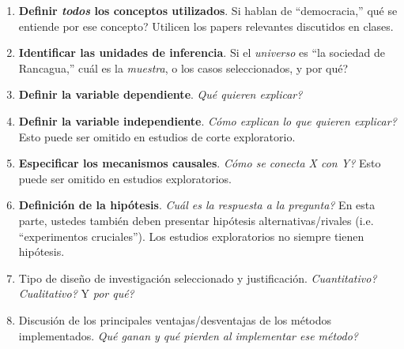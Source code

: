 \documentclass[letterpaper]{article}
\begin{document}
\begin{enumerate}
	\item {\bf Definir \emph{todos} los conceptos utilizados}. Si hablan de ``democracia,'' qu\'e se entiende por ese concepto? Utilicen los papers relevantes discutidos en clases.
	\item {\bf Identificar las unidades de inferencia}. Si el \emph{universo} es ``la sociedad de Rancagua,'' cu\'al es la \emph{muestra}, o los casos seleccionados, y por qu\'e?
	\item {\bf Definir la variable dependiente}. \emph{Qu\'e quieren explicar?}
	\item {\bf Definir la variable independiente}. \emph{C\'omo explican lo que quieren explicar?} Esto puede ser omitido en estudios de corte exploratorio.
	\item {\bf Especificar los mecanismos causales}. \emph{C\'omo se conecta X con Y?} Esto puede ser omitido en estudios exploratorios.
	\item {\bf Definici\'on de la hip\'otesis}. \emph{Cu\'al es la respuesta a la pregunta?} En esta parte, ustedes tambi\'en deben presentar hip\'otesis alternativas/rivales (i.e. ``experimentos cruciales''). Los estudios exploratorios no siempre tienen hip\'otesis. 
	\item Tipo de dise\~no de investigaci\'on seleccionado y justificaci\'on. \emph{Cuantitativo? Cualitativo?} Y \emph{por qu\'e?}
	\item Discusi\'on de los principales ventajas/desventajas de los m\'etodos implementados. \emph{Qu\'e ganan y qu\'e pierden al implementar ese m\'etodo?}
\end{enumerate}
\end{document}
